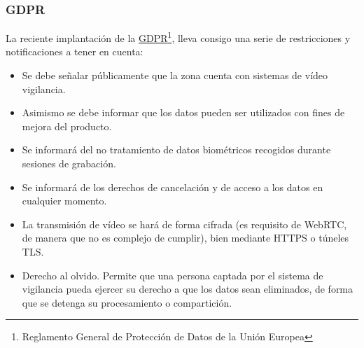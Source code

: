 \subsubsection{GDPR}
La reciente implantación de la \href{https://www.eugdpr.org/key-changes.html}{GDPR}\footnote{Reglamento General de Protección de Datos de la Unión Europea}, lleva consigo una serie de restricciones y notificaciones a tener en cuenta: 
\begin{itemize}
\item Se debe señalar públicamente que la zona cuenta con sistemas de vídeo vigilancia.
\item Asimismo se debe informar que los datos pueden ser utilizados con fines de mejora del producto.
\item Se informará del no tratamiento de datos biométricos recogidos durante sesiones de grabación.
\item Se informará de los derechos de cancelación y de acceso a los datos en cualquier momento.
\item La transmisión de vídeo se hará de forma cifrada (es requisito de WebRTC, de manera que no es complejo de cumplir), bien mediante HTTPS o túneles TLS. 
\item Derecho al olvido. Permite que una persona captada por el sistema de vigilancia pueda ejercer su derecho a que los datos sean eliminados, de forma que se detenga su procesamiento o compartición. 
\end{itemize}




